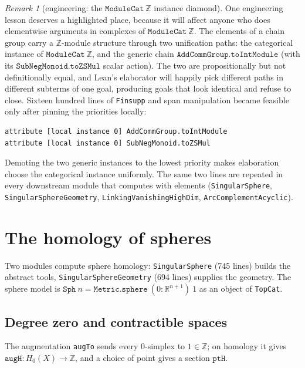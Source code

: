\documentclass[11pt]{article}
\theoremstyle{remark}
\newtheorem{remark}[theorem]{Remark}
\newcommand{\Z}{\mathbb{Z}}
\newcommand{\R}{\mathbb{R}}
\newcommand{\leanname}[1]{\texttt{#1}}
\begin{document}
\begin{remark}[engineering: the $\leanname{ModuleCat}\ \Z$ instance diamond]
\label{rem:diamond}
One engineering lesson deserves a highlighted place, because it will affect
anyone who does elementwise arguments in complexes of
$\leanname{ModuleCat}\ \Z$. The elements of a chain group carry a
$\Z$-module structure through two unification paths: the categorical
instance of $\leanname{ModuleCat}\ \Z$, and the generic chain
$\leanname{AddCommGroup.toIntModule}$ (with its
$\leanname{SubNegMonoid.toZSMul}$ scalar action). The two are propositionally
but not definitionally equal, and Lean's elaborator will happily pick
different paths in different subterms of one goal, producing goals that look
identical and refuse to close. Sixteen hundred lines of
\leanname{Finsupp} and span manipulation became feasible only after pinning
the priorities locally:
\begin{lstlisting}
attribute [local instance 0] AddCommGroup.toIntModule
attribute [local instance 0] SubNegMonoid.toZSMul
\end{lstlisting}
Demoting the two generic instances to the lowest priority makes elaboration
choose the categorical instance uniformly. The same two lines are repeated
in every downstream module that computes with elements
(\leanname{SingularSphere}, \leanname{SingularSphereGeometry},
\leanname{LinkingVanishingHighDim}, \leanname{ArcComplementAcyclic}).
\end{remark}

\section{The homology of spheres}\label{sec:spheres}

Two modules compute sphere homology: \leanname{SingularSphere} (745 lines)
builds the abstract tools, \leanname{SingularSphereGeometry} (694 lines)
supplies the geometry. The sphere model is
$\leanname{Sph}\ n = \leanname{Metric.sphere}\ (0 : \R^{n+1})\ 1$ as an
object of \leanname{TopCat}.

\subsection{Degree zero and contractible spaces}

The augmentation \leanname{augTo} sends every $0$-simplex to
$1 \in \Z$; on homology it gives $\leanname{augH} : H_0(X) \to \Z$, and a
choice of point gives a section $\leanname{ptH}$.
\end{document}
